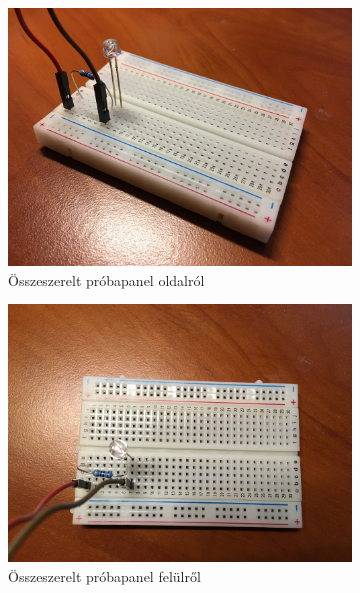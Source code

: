 \documentclass[a4paper,12pt]{report}
\begin{document}
    \begin{figure}[h!]
        \centering
        \begin{subfigure}[b]{0.4\linewidth}
            \includegraphics[width=\linewidth]{images/osszeszerelt1.jpg}
            \caption{Összeszerelt próbapanel oldalról}
        \end{subfigure}
        \begin{subfigure}[b]{0.4\linewidth}
            \includegraphics[width=\linewidth]{images/osszeszerelt2.jpg}
            \caption{Összeszerelt próbapanel felülről}
        \end{subfigure}
        \begin{subfigure}[b]{0.5\linewidth}

\end{subfigure}
\end{figure}
\end{document}
